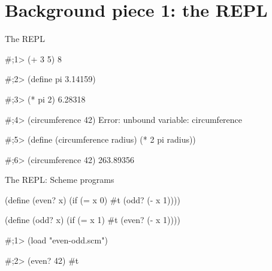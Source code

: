 

\begin{frame}
\maketitle
\end{frame}

\section{Background piece 1: the REPL}

\begin{frame}[fragile]{The REPL}
\begin{listingbox}\begin{schemerepl}
#;1> (+ 3 5)
8

#;2> (define pi 3.14159)

#;3> (* pi 2)
6.28318

#;4> (circumference 42)
Error: unbound variable: circumference

#;5> (define (circumference radius) (* 2 pi radius))

#;6> (circumference 42)
263.89356
\end{schemerepl}\end{listingbox}
\end{frame}

\begin{frame}[fragile]{The REPL: Scheme programs}
\begin{listingbox}\begin{schemecode}
(define (even? x)
  (if (= x 0)
    #t
    (odd? (- x 1))))

(define (odd? x)
  (if (= x 1)
    #t
    (even? (- x 1))))
\end{schemecode}\end{listingbox}
\begin{listingbox}\begin{schemerepl}
#;1> (load "even-odd.scm")

#;2> (even? 42)
#t
\end{schemerepl}\end{listingbox}
\end{frame}


